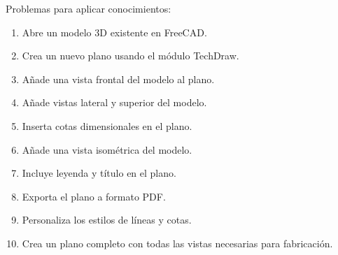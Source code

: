 Problemas para aplicar conocimientos:
\begin{enumerate}
	\item Abre un modelo 3D existente en FreeCAD.
	\item Crea un nuevo plano usando el módulo TechDraw.
	\item Añade una vista frontal del modelo al plano.
	\item Añade vistas lateral y superior del modelo.
	\item Inserta cotas dimensionales en el plano.
	\item Añade una vista isométrica del modelo.
	\item Incluye leyenda y título en el plano.
	\item Exporta el plano a formato PDF.
	\item Personaliza los estilos de líneas y cotas.
	\item Crea un plano completo con todas las vistas
	      necesarias para fabricación.
\end{enumerate}